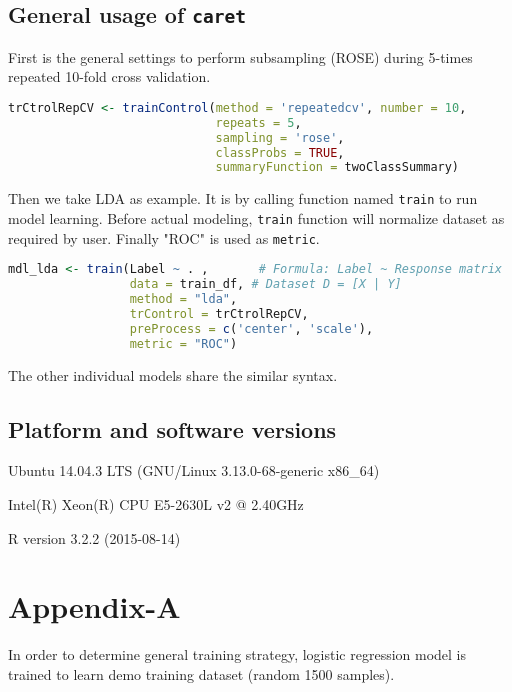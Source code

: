 \subsection{General usage of \texttt{caret}}
First is the general settings to perform subsampling (ROSE) during 5-times repeated 10-fold cross validation. 

\begin{lstlisting}[language=R]
trCtrolRepCV <- trainControl(method = 'repeatedcv', number = 10, 
                             repeats = 5, 
                             sampling = 'rose', 
                             classProbs = TRUE, 
                             summaryFunction = twoClassSummary)
\end{lstlisting}

Then we take LDA as example. It is by calling function named \texttt{train} to run model learning. Before actual modeling,  \texttt{train} function will normalize dataset as required by user. Finally "ROC" is used as \texttt{metric}. 

\begin{lstlisting}[language=R]                             
mdl_lda <- train(Label ~ . ,       # Formula: Label ~ Response matrix
                 data = train_df, # Dataset D = [X | Y]
                 method = "lda",  
                 trControl = trCtrolRepCV, 
                 preProcess = c('center', 'scale'), 
                 metric = "ROC")
\end{lstlisting}

The other individual models share the similar syntax. 

\subsection{Platform and software versions}

\noindent Ubuntu 14.04.3 LTS (GNU/Linux 3.13.0-68-generic x86\_64)

Intel(R) Xeon(R) CPU E5-2630L v2 @ 2.40GHz

R version 3.2.2 (2015-08-14)

\section{Appendix-A}\label{sec:append-a}
In order to determine general training strategy, logistic regression model is trained to learn demo training dataset (random 1500 samples). 
%

